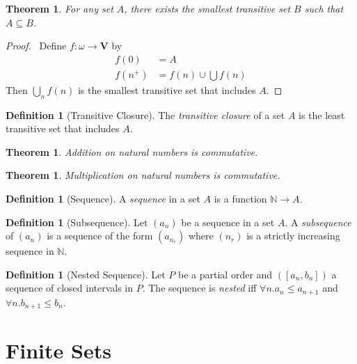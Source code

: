 \documentclass{report}
\let\qed\relax
\newtheorem{theorem}[axiom]{Theorem}
\theoremstyle{definition}
\newtheorem{definition}[axiom]{Definition}
\begin{document}
    \begin{theorem}
        For any set $A$, there exists the smallest transitive set $B$ such that $A \subseteq B$.
    \end{theorem}

    \begin{proof}
        \pf\ Define $f : \omega \rightarrow \mathbf{V}$ by
        \begin{align*}
            f(0) & = A \\
            f(n^+) & = f(n) \cup \bigcup f(n)
        \end{align*}
        Then $\bigcup_n f(n)$ is the smallest transitive set that includes $A$. \qed
    \end{proof}

    \begin{definition}[Transitive Closure]
        The \emph{transitive closure} of a set $A$ is the least transitive set that includes $A$.
    \end{definition}

    \begin{theorem}
        Addition on natural numbers is commutative.
    \end{theorem}

    \begin{theorem}
        Multiplication on natural numbers is commutative.
    \end{theorem}

    \begin{definition}[Sequence]
        A \emph{sequence} in a set $A$ is a function $\mathbb{N} \rightarrow A$.    
    \end{definition}

    \begin{definition}[Subsequence]
        Let $(a_n)$ be a sequence in a set $A$. A \emph{subsequence} of $(a_n)$ is a sequence of the form
        $(a_{n_r})$ where $(n_r)$ is a strictly increasing sequence in $\mathbb{N}$.
    \end{definition}

    \begin{definition}[Nested Sequence]
        Let $P$ be a partial order and $([a_n,b_n])$ a sequence of closed intervals in $P$. The sequence is
        \emph{nested} iff $\forall n. a_n \leq a_{n+1}$ and $\forall n. b_{n+1} \leq b_n$.
    \end{definition}
    
    \section{Finite Sets}
\end{document}
